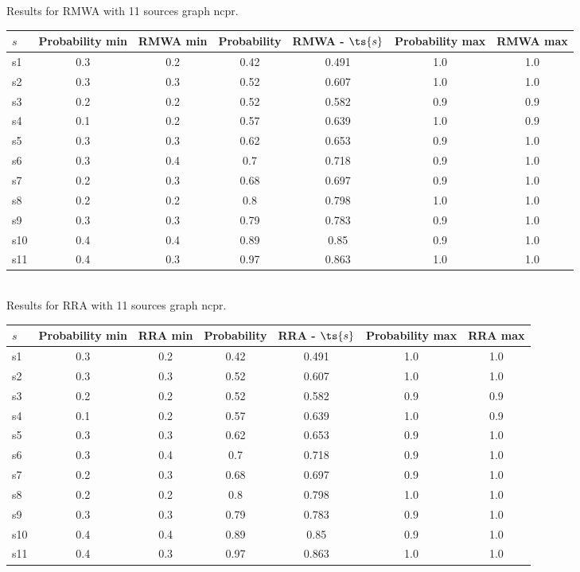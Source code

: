 \documentclass{article}
\begin{document}
\noindent Results for RMWA with 11 sources graph ncpr.

\noindent\begin{tabular}{|l|c|c|c|c|c|c|}
\hline
$s$& Probability min & RMWA min & Probability & RMWA - $\ts{s}$ & Probability max & RMWA max\\
\hline
s1 &0.3 & 0.2 & 0.42 & 0.491 & 1.0 & 1.0\\
\hline
s2 &0.3 & 0.3 & 0.52 & 0.607 & 1.0 & 1.0\\
\hline
s3 &0.2 & 0.2 & 0.52 & 0.582 & 0.9 & 0.9\\
\hline
s4 &0.1 & 0.2 & 0.57 & 0.639 & 1.0 & 0.9\\
\hline
s5 &0.3 & 0.3 & 0.62 & 0.653 & 0.9 & 1.0\\
\hline
s6 &0.3 & 0.4 & 0.7 & 0.718 & 0.9 & 1.0\\
\hline
s7 &0.2 & 0.3 & 0.68 & 0.697 & 0.9 & 1.0\\
\hline
s8 &0.2 & 0.2 & 0.8 & 0.798 & 1.0 & 1.0\\
\hline
s9 &0.3 & 0.3 & 0.79 & 0.783 & 0.9 & 1.0\\
\hline
s10 &0.4 & 0.4 & 0.89 & 0.85 & 0.9 & 1.0\\
\hline
s11 &0.4 & 0.3 & 0.97 & 0.863 & 1.0 & 1.0\\
\hline
\end{tabular}\\

\noindent Results for RRA with 11 sources graph ncpr.

\noindent\begin{tabular}{|l|c|c|c|c|c|c|}
\hline
$s$& Probability min & RRA min & Probability & RRA - $\ts{s}$ & Probability max & RRA max\\
\hline
s1 &0.3 & 0.2 & 0.42 & 0.491 & 1.0 & 1.0\\
\hline
s2 &0.3 & 0.3 & 0.52 & 0.607 & 1.0 & 1.0\\
\hline
s3 &0.2 & 0.2 & 0.52 & 0.582 & 0.9 & 0.9\\
\hline
s4 &0.1 & 0.2 & 0.57 & 0.639 & 1.0 & 0.9\\
\hline
s5 &0.3 & 0.3 & 0.62 & 0.653 & 0.9 & 1.0\\
\hline
s6 &0.3 & 0.4 & 0.7 & 0.718 & 0.9 & 1.0\\
\hline
s7 &0.2 & 0.3 & 0.68 & 0.697 & 0.9 & 1.0\\
\hline
s8 &0.2 & 0.2 & 0.8 & 0.798 & 1.0 & 1.0\\
\hline
s9 &0.3 & 0.3 & 0.79 & 0.783 & 0.9 & 1.0\\
\hline
s10 &0.4 & 0.4 & 0.89 & 0.85 & 0.9 & 1.0\\
\hline
s11 &0.4 & 0.3 & 0.97 & 0.863 & 1.0 & 1.0\\
\hline
\end{tabular}\\
\end{document}
